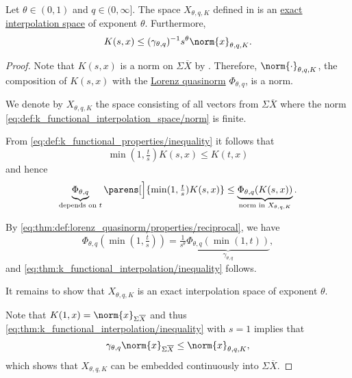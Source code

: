 \begin{theorem}\label{thm:k_functional_interpolation}
  Let \( \theta \in (0, 1) \) and \( q \in (0, \infty] \). The space \( X_{\theta,q,K} \) defined in  is an \hyperref[def:banach_interpolation_space_exponent]{exact interpolation space} of exponent \( \theta \). Furthermore,
  \begin{equation}\label{eq:thm:k_functional_interpolation/inequality}
    K(s, x) \leq (\gamma_{\theta,q})^{-1} s^\theta \norm{x}_{\theta,q,K}.
  \end{equation}
\end{theorem}
\begin{proof}
  Note that \( K(s, x) \) is a norm on \( \Sigma \overline{X} \) by . Therefore, \( \norm{\cdot}_{\theta,q,K} \), the composition of \( K(s, x) \) with the \hyperref[def:lorenz_quasinorm]{Lorenz quasinorm} \( \Phi_{\theta,q} \), is a norm.

  We denote by \( X_{\theta,q,K} \) the space consisting of all vectors from \( \Sigma \overline{X} \) where the norm \eqref{eq:def:k_functional_interpolation_space/norm} is finite.

  From \eqref{eq:def:k_functional_properties/inequality} it follows that
  \begin{equation*}
    \min(1, \tfrac t s) K(s, x) \leq K(t, x)
  \end{equation*}
  and hence
  \begin{equation*}
    \underbrace{\Phi_{\theta,q}}_{\text{depends on } t} \parens[\Big]{ \min(1, \tfrac t s) K(s, x) } \leq \underbrace{\Phi_{\theta,q}(K(s, x))}_{\text{norm in } X_{\theta,q,K}}.
  \end{equation*}

  By \eqref{eq:thm:def:lorenz_quasinorm/properties/reciprocal}, we have
  \begin{equation*}
    \Phi_{\theta,q}(\min(1, \tfrac t s)) = \tfrac 1 {s^\theta} \underbrace{\Phi_{\theta,q}(\min(1, t))}_{\hyperref[eq:def:lorenz_quasinorm/gamma]{\gamma_{\theta,q}}},
  \end{equation*}
  and \eqref{eq:thm:k_functional_interpolation/inequality} follows.

  It remains to show that \( X_{\theta,q,K} \) is an exact interpolation space of exponent \( \theta \).

  Note that \( K(1, x) = \norm{x}_{\Sigma \overline{X}} \) and thus \eqref{eq:thm:k_functional_interpolation/inequality} with \( s = 1 \) implies that
  \begin{equation*}
    \gamma_{\theta,q} \norm{x}_{\Sigma \overline{X}} \leq \norm{x}_{\theta,q,K},
  \end{equation*}
  which shows that \( X_{\theta,q,K} \) can be embedded continuously into \( \Sigma \overline{X} \).


\end{proof}
